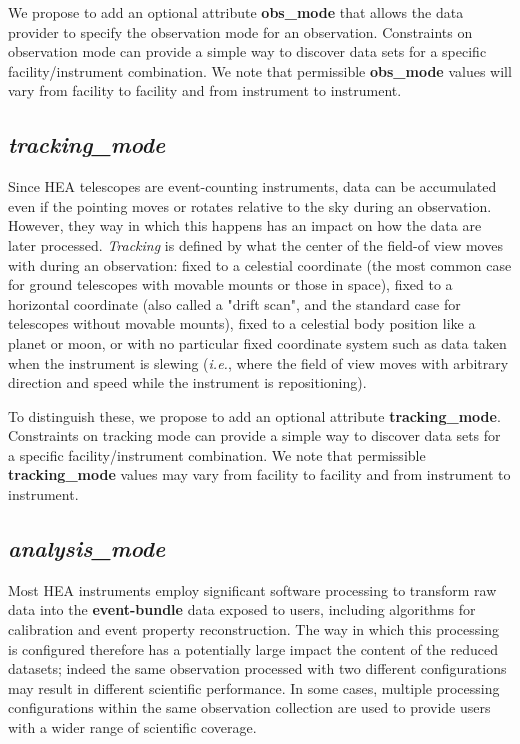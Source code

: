 \documentclass[11pt,a4paper]{ivoa}
\begin{document}
We propose to add an optional attribute {\bf obs\_mode} that allows the data provider to specify the observation mode for an observation.  Constraints on observation mode can provide a simple way to discover data sets for a specific facility/instrument combination.  We note that permissible {\bf obs\_mode} values will vary from facility to facility and from instrument to instrument.


\subsection{{\em tracking\_mode}}

Since \gls{HEA}  telescopes are  event-counting instruments, data can be accumulated even if the pointing moves or rotates relative to the sky during an observation.  However, they way in which this happens has an impact on how the data are later processed. \emph{Tracking} is defined by what the  center of the field-of view moves with during an observation: fixed to a celestial coordinate (the most common case for ground telescopes with movable mounts or those in space),  fixed to a horizontal coordinate (also called a "drift scan", and the standard case for telescopes without movable mounts),  fixed to a celestial body position like a planet or moon, or with no particular fixed coordinate system such as data taken when the instrument is slewing ({\em i.e.\/}, where the field of view moves with arbitrary direction and speed while the instrument is repositioning).

To distinguish these, we propose to add an optional attribute {\bf tracking\_mode}. Constraints on tracking mode can provide a simple way to discover data sets for a specific facility/instrument combination. We note that permissible {\bf tracking\_mode} values may vary from facility to facility and from instrument to instrument.


\subsection{{\em analysis\_mode}}

Most \gls{HEA} instruments employ significant software processing to transform raw data into the {\bf event-bundle} data exposed to users, including algorithms for calibration and event property reconstruction. The way in which this processing is configured therefore has a potentially large impact the content of the reduced datasets; indeed the same observation processed with two different configurations may result in different scientific performance. In some cases, multiple processing configurations within the same observation collection are used to provide users with a wider range of scientific coverage.
\end{document}
